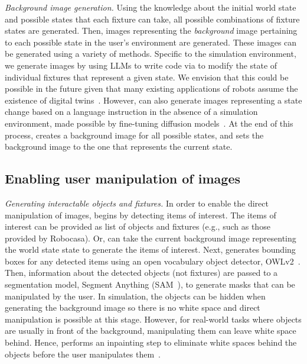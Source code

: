 \noindent \emph{Background image generation.} Using the knowledge about the initial world state and possible states that each fixture can take, all possible combinations of fixture states are generated. Then, 
images representing the \textit{background} image pertaining to each possible state in the user's environment are generated. These images can be generated using a variety of methods. Specific to the simulation environment, we generate images by using LLMs to write code via to modify the state of individual fixtures that represent a given state. We envision that this could be possible in the future given that many existing applications of robots assume the existence of digital twins~. However, \projname can also generate images representing a state change based on a language instruction in the absence of a simulation environment, made possible by fine-tuning diffusion models~\cite{brooks2023instructpix2pix, black2023zero}. At the end of this process, \projname creates a background image for all possible states, and sets the background image to the one that represents the current state.

\subsection{Enabling user manipulation of images}
\noindent \emph{Generating interactable objects and fixtures.} In order to enable the direct manipulation of images, \projname begins by detecting items of interest. The items of interest can be provided as list of objects and fixtures (e.g., such as those provided by Robocasa). Or, \projname can take the current background image representing the world state state to generate the items of interest. Next, \projname generates bounding boxes for any detected items using an open vocabulary object detector, OWLv2~\cite{minderer2024scaling}. Then, information about the detected objects (not fixtures) are passed to a segmentation model, Segment Anything (SAM~\cite{kirillov2023segment}), to generate masks that can be manipulated by the user. In simulation, the objects can be hidden when generating the background image so there is no white space and direct manipulation is possible at this stage. However, for real-world tasks where objects are usually in front of the background, manipulating them can leave white space behind. Hence, \projname performs an inpainting step to eliminate white spaces behind the objects before the user manipulates them~\cite{suvorov2022resolution}. 

